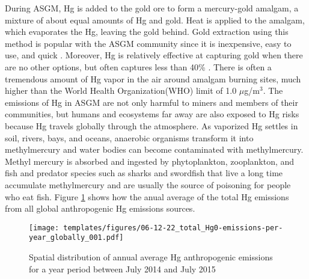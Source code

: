 \begin{flushleft} 
During ASGM, Hg is added to the gold ore to form a mercury-gold amalgam, a mixture of about equal amounts of Hg and gold\cite{united_nations_environment_programme_reducing_2012}. Heat is applied to the amalgam, which evaporates the Hg, leaving the gold behind. Gold extraction using this method is popular with the ASGM community since it is inexpensive, easy to use, and quick \cite{united_nations_environment_programme_reducing_2012}. Moreover, Hg is relatively effective at capturing gold when there are no other options, but often captures less than 40\% \cite{united_nations_environment_programme_developing_2015}. There is often a tremendous amount of Hg vapor in the air around amalgam burning sites, much higher than the World Health Organization(WHO) limit of 1.0 $\mu$g/m$^{3}$\cite{gibb_mercury_2014}. The emissions of Hg in ASGM are not only harmful to miners and members of their communities, but humans and ecosystems far away are also exposed to Hg risks because Hg travels globally through the atmosphere. As vaporized Hg settles in soil, rivers, bays, and oceans, anaerobic organisms transform it into methylmercury and water bodies can become contaminated with methylmercury. Methyl mercury is absorbed and ingested by phytoplankton, zooplankton, and fish and predator species such as sharks and swordfish that live a long time accumulate methylmercury and are usually the source of poisoning for people who eat fish. Figure \ref{fig:world_hg_emisions} shows how the anual average of the total Hg emissions from  all global anthropogenic Hg emissions sources. 
\end{flushleft}

\begin{figure}[H]
  \texttt{[image: templates/figures/06-12-22\_total\_Hg0-emissions-per-year\_globally\_001.pdf]}
  \centering
  \caption{Spatial distribution of annual average Hg anthropogenic emissions for a year period between July 2014 and July 2015 \cite{united_nations_environment_programme_technical_2019}}
  \label{fig:world_hg_emisions}
\end{figure}
\FloatBarrier

